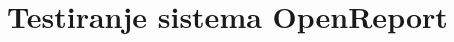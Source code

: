 \documentclass[a4paper, 12pt]{book}
\begin{document}
\section{Testiranje sistema OpenReport}

% 
% 
% 
% 
% 
% 
% 
\end{document}
